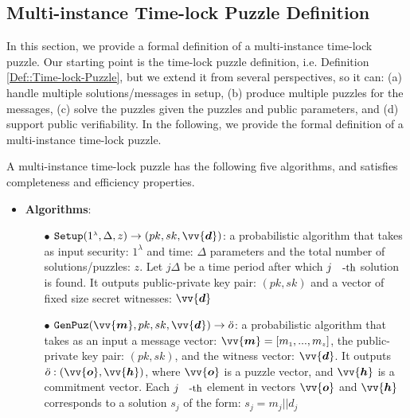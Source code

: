 \subsection{Multi-instance   Time-lock Puzzle Definition}\label{Section::Multi-instance-Time-lock Puzzle-Definition}
In this section, we provide a formal definition of a multi-instance time-lock puzzle. Our starting point is the  time-lock puzzle definition, i.e. Definition \ref{Def::Time-lock-Puzzle}, but we extend it from several  perspectives, so it can: (a) handle multiple  solutions/messages in setup, (b)  produce multiple puzzles for the messages,   (c) solve the puzzles given the puzzles and public parameters, and (d) support public verifiability. In the following, we provide the formal definition of a multi-instance  time-lock puzzle.
\begin{definition} A multi-instance time-lock puzzle has the following  five algorithms, and satisfies completeness and efficiency properties. 
\begin{itemize}[leftmargin=.43cm]
\item \textbf{Algorithms}:
\begin{itemize} 
\item[$\bullet$]$\mathtt{Setup}(1^{\scriptscriptstyle\lambda},\Delta,z)\rightarrow (pk,sk,\vv{\bm{d}})$:  a probabilistic algorithm that takes as input  security: $1^{\scriptscriptstyle\lambda}$ and time:  $\Delta$ parameters and the total number of solutions/puzzles: $z$. Let     $j \Delta$ be a time period after which $j\text{\small{-th}}$ solution is found.   It outputs public-private key pair: $(pk,sk)$ and a vector of fixed size  secret witnesses: $\vv{\bm{d}}$


\item[$\bullet$]$\mathtt {GenPuz}(\vv{\bm{m}}, pk, sk,\vv{\bm{d}})\rightarrow \ddot{o}$:  a probabilistic algorithm that takes as an input  a  message vector: $\vv{\bm{m}}=[m_{\scriptscriptstyle 1},...,m_{\scriptscriptstyle z}]$,  the public-private key pair: $(pk,sk)$, and the witness vector: $\vv{\bm{d}}$. It  outputs $\ddot{o}:(\vv{\bm{o}},\vv{\bm{h}})$, where $\vv{\bm{o}}$ is a puzzle vector, and $\vv{\bm{h}}$ is a commitment vector. Each $j\text{\small{-th}}$ element in  vectors $\vv{\bm{o}}$ and $\vv{\bm{h}}$ corresponds to a solution $s_{\scriptscriptstyle j}$ of the form: $s_{\scriptscriptstyle j}=m_{\scriptscriptstyle j}||d_{\scriptscriptstyle j}$ %
 

\end{itemize}
\end{itemize}
\end{definition}
